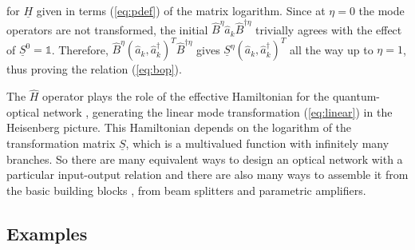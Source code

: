 \documentclass[12pt,amsmath,amssymb]{article}
\numberwithin{equation}{section}
\begin{document}
for $\underline{H}$ given in terms (\ref{eq:pdef}) of the matrix
logarithm. Since at $\eta=0$ the mode operators are not
transformed, the initial $\hat{B}^\eta \hat{a}_k
\hat{B}^{\dagger\eta}$ trivially agrees with the effect of
$\underline{S}^0=\mathds{1}$. Therefore, $\hat{B}^\eta(\hat{a}_k,
\hat{a}_k^\dagger)^T\hat{B}^{\dagger\eta}$ gives
$\underline{S}^\eta(\hat{a}_k, \hat{a}_k^\dagger)^T$ all the way
up to $\eta=1$, thus proving the relation (\ref{eq:bop}).

The $\hat{H}$ operator plays the role of the effective Hamiltonian
for the quantum-optical network \cite{Torma1,Torma3}, generating
the linear mode transformation (\ref{eq:linear}) in the Heisenberg
picture. This Hamiltonian depends on the logarithm of the
transformation matrix $\underline{S}$, which is a multivalued
function with infinitely many branches. So there are
many equivalent ways to design an optical network with a
particular input-output relation and there are also many ways
to assemble it from the
basic building blocks \cite{Reck,Torma1,Torma3}, from beam
splitters and parametric amplifiers.

\subsection{Examples}
\end{document}
